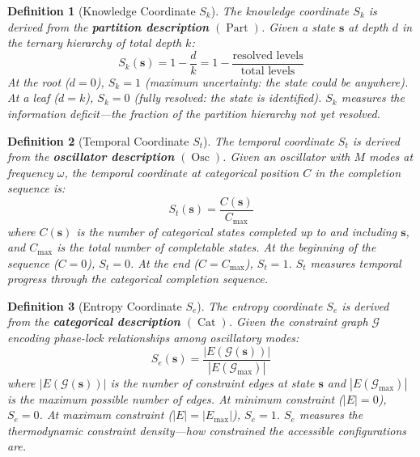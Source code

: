 \documentclass[12pt,twocolumn]{article}
\newtheorem{definition}{Definition}[section]
\DeclareMathOperator{\Cat}{Cat}
\DeclareMathOperator{\Part}{Part}
\DeclareMathOperator{\Osc}{Osc}
\begin{document}
\begin{definition}[Knowledge Coordinate $S_k$]
\label{def:s_k}
The knowledge coordinate $S_k$ is derived from the \textbf{partition description} $(\Part)$. Given a state $\mathbf{s}$ at depth $d$ in the ternary hierarchy of total depth $k$:
\begin{equation}
\label{eq:s_k}
S_k(\mathbf{s}) = 1 - \frac{d}{k} = 1 - \frac{\text{resolved levels}}{\text{total levels}}
\end{equation}
At the root ($d = 0$), $S_k = 1$ (maximum uncertainty: the state could be anywhere). At a leaf ($d = k$), $S_k = 0$ (fully resolved: the state is identified). $S_k$ measures the \emph{information deficit}---the fraction of the partition hierarchy not yet resolved.
\end{definition}

\begin{definition}[Temporal Coordinate $S_t$]
\label{def:s_t}
The temporal coordinate $S_t$ is derived from the \textbf{oscillator description} $(\Osc)$. Given an oscillator with $M$ modes at frequency $\omega$, the temporal coordinate at categorical position $C$ in the completion sequence is:
\begin{equation}
\label{eq:s_t}
S_t(\mathbf{s}) = \frac{C(\mathbf{s})}{C_{\max}}
\end{equation}
where $C(\mathbf{s})$ is the number of categorical states completed up to and including $\mathbf{s}$, and $C_{\max}$ is the total number of completable states. At the beginning of the sequence ($C = 0$), $S_t = 0$. At the end ($C = C_{\max}$), $S_t = 1$. $S_t$ measures \emph{temporal progress} through the categorical completion sequence.
\end{definition}

\begin{definition}[Entropy Coordinate $S_e$]
\label{def:s_e}
The entropy coordinate $S_e$ is derived from the \textbf{categorical description} $(\Cat)$. Given the constraint graph $\mathcal{G}$ encoding phase-lock relationships among oscillatory modes:
\begin{equation}
\label{eq:s_e}
S_e(\mathbf{s}) = \frac{|E(\mathcal{G}(\mathbf{s}))|}{|E(\mathcal{G}_{\max})|}
\end{equation}
where $|E(\mathcal{G}(\mathbf{s}))|$ is the number of constraint edges at state $\mathbf{s}$ and $|E(\mathcal{G}_{\max})|$ is the maximum possible number of edges. At minimum constraint ($|E| = 0$), $S_e = 0$. At maximum constraint ($|E| = |E_{\max}|$), $S_e = 1$. $S_e$ measures the \emph{thermodynamic constraint density}---how constrained the accessible configurations are.
\end{definition}
\end{document}
